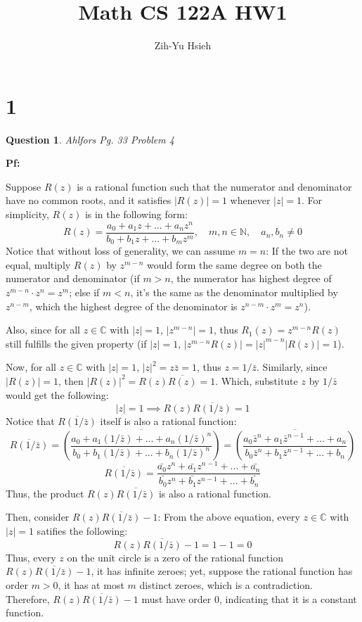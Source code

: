 \documentclass{article}
\title{Math CS 122A HW1}
\author{Zih-Yu Hsieh}
\newtheorem{question}{Question}
\begin{document}
\maketitle

\section*{1}
\begin{question}
    Ahlfors Pg. 33 Problem 4
\end{question}

\textbf{Pf:}

Suppose $R(z)$ is a rational function such that the numerator and denominator have no common roots, and it satisfies $|R(z)|=1$ whenever $|z|=1$. 
For simplicity, $R(z)$ is in the following form:
$$R(z)=\frac{a_0+a_1z+...+a_nz^n}{b_0+b_1z+...+b_mz^m},\quad m,n\in\mathbb{N},\quad a_n,b_n\neq 0$$
Notice that without loss of generality, we can assume $m=n$: If the two are not equal, multiply $R(z)$ by $z^{m-n}$ would form the 
same degree on both the numerator and denominator (if $m>n$, the numerator has highest degree of $z^{m-n}\cdot z^n=z^m$; else if $m<n$, 
it's the same as the denominator multiplied by $z^{n-m}$, which the highest degree of the denominator is $z^{n-m}\cdot z^m=z^n$).

Also, since for all $z\in\mathbb{C}$ with $|z|=1$, $|z^{m-n}|=1$, thus $R_1(z)=z^{m-n}R(z)$
still fulfills the given property (if $|z|=1$, $|z^{m-n}R(z)|=|z|^{m-n}|R(z)|=1$).

\hfill

Now, for all $z\in\mathbb{C}$ with $|z|=1$, $|z|^2=z\bar{z}=1$, thus $z=1/\bar{z}$. Similarly, since $|R(z)|=1$, then 
$|R(z)|^2=R(z)\overline{R(z)}=1$. Which, substitute $z$ by $1/\bar{z}$ would get the following:
$$|z|=1\implies R(z)\overline{R(1/\bar{z})}=1$$
Notice that $\overline{R(1/\bar{z})}$ itself is also a rational function:
$$\overline{R(1/\bar{z})}=\overline{\left(\frac{a_0+a_1(1/\bar{z})+...+a_n(1/\bar{z})^n}{b_0+b_1(1/\bar{z})+...+b_n(1/\bar{z})^n}\right)} = \overline{\left(\frac{a_0\bar{z}^n+a_1\bar{z}^{n-1}+...+a_n}{b_0\bar{z}^n+b_1\bar{z}^{n-1}+...+b_n}\right)}$$
$$\overline{R(1/\bar{z})}=\frac{\bar{a_0}z^n+\bar{a_1}z^{n-1}+...+\bar{a_n}}{\bar{b_0}z^n+\bar{b_1}z^{n-1}+...+\bar{b_n}}$$
Thus, the product $R(z)\overline{R(1/\bar{z})}$ is also a rational function.

\hfill

Then, consider $R(z)\overline{R(1/\bar{z})}-1$: From the above equation, every $z\in\mathbb{C}$ with $|z|=1$ satifies the following:
$$R(z)\overline{R(1/\bar{z})}-1=1-1=0$$
Thus, every $z$ on the unit circle is a zero of the rational function $R(z)\overline{R(1/\bar{z})}-1$, it has infinite zeroes; yet, suppose the rational function has order $m>0$, it has at most $m$ distinct zeroes, which is a contradiction. Therefore, $R(z)\overline{R(1/\bar{z})}-1$ must have order $0$, indicating that it is a constant function.
\end{document}
